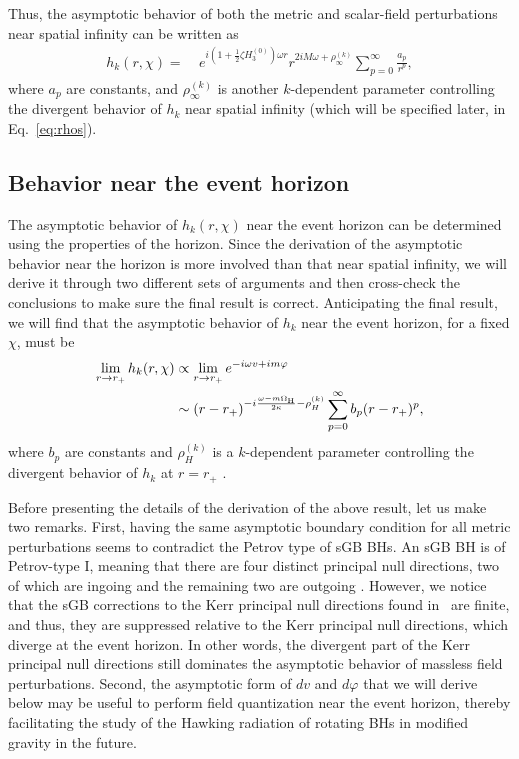 \documentclass[aps,prx,amsmath,floats,floatfix,twocolumn,
  superscriptaddress,nofootinbib,showpacs]{revtex4-1}
\begin{document}
Thus, the asymptotic behavior of both the metric and scalar-field perturbations near spatial infinity can be written as
\begin{equation}
\label{eq:asymptotic_limits3}
\begin{split}
h_k (r, \chi)  = ~ & e^{i \left(1 + \frac{1}{2} \zeta H_3^{(0)} \right)\omega r} r^{2 i M \omega  + \rho_{\infty}^{(k)}}  \sum^{\infty}_{p=0}\frac{a_{p}}{r^p},  
\end{split}
\end{equation}
where $a_p$ are constants, and $\rho_{\infty}^{(k)}$ is another $k$-dependent parameter controlling the divergent behavior of $h_{k}$ near spatial infinity (which will be specified later, in Eq.~\eqref{eq:rhos}).


\subsection{Behavior near the event horizon}

The asymptotic behavior of $h_k(r, \chi)$ near the event horizon can be determined using the properties of the horizon. 
Since the derivation of the asymptotic behavior near the horizon is more involved than that near spatial infinity, we will derive it through two different sets of arguments and then cross-check the conclusions to make sure the final result is correct. Anticipating the final result, we will find that the asymptotic behavior of $h_k$ near the event horizon, for a fixed $\chi$, must be 
\begin{equation}
\label{eq:asymptotic_limits1}
\begin{split}
\lim \limits_{r \rightarrow r_+} h_k (r, \chi) & \propto \lim \limits_{r \rightarrow r_+}  e^{- i \omega v + i m \varphi}\\
& \sim \left( r-r_+ \right)^{-i\frac{\omega - m \Omega_{\rm H}}{2 \kappa} - \rho_H^{(k)}}\sum_{p=0}^{\infty} b_{p} (r-r_+)^{p}, 
\end{split}
\end{equation}
where $b_{p}$ are constants and $\rho_{H}^{(k)}$ is a $k$-dependent parameter controlling the divergent behavior of $h_{k}$ at $r=r_+$ \cite{Chung:2023zdq}.

Before presenting the details of the derivation of the above result, let us make two remarks. 
First, having the same asymptotic boundary condition for all metric perturbations seems to contradict the Petrov type of sGB BHs. 
An sGB BH is of Petrov-type I, meaning that there are four distinct principal null directions, two of which are ingoing and the remaining two are outgoing \cite{Yagi:2012ya,Owen:2021eez}. 
However, we notice that the sGB corrections to the Kerr principal null directions found in~\cite{Owen:2021eez} are finite, and thus, they are suppressed relative to the Kerr principal null directions, which diverge at the event horizon. 
In other words, the divergent part of the Kerr principal null directions still dominates the asymptotic behavior of massless field perturbations. 
Second, the asymptotic form of $d v$ and $d \varphi$ that we will derive below may be useful to perform field quantization near the event horizon, thereby facilitating the study of the Hawking radiation of rotating BHs in modified gravity in the future.  
\end{document}
